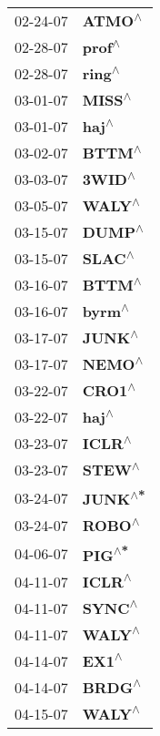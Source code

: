 \begin{supertabular}{p{0.08\textwidth}p{0.2\textwidth}}
 02-24-07 &    \textbf{ATMO\textsuperscript{$\wedge$}} \\
 02-28-07 &    \textbf{prof\textsuperscript{$\wedge$}} \\
 02-28-07 &    \textbf{ring\textsuperscript{$\wedge$}} \\
 03-01-07 &    \textbf{MISS\textsuperscript{$\wedge$}} \\
 03-01-07 &     \textbf{haj\textsuperscript{$\wedge$}} \\
 03-02-07 &    \textbf{BTTM\textsuperscript{$\wedge$}} \\
 03-03-07 &    \textbf{3WID\textsuperscript{$\wedge$}} \\
 03-05-07 &    \textbf{WALY\textsuperscript{$\wedge$}} \\
 03-15-07 &    \textbf{DUMP\textsuperscript{$\wedge$}} \\
 03-15-07 &    \textbf{SLAC\textsuperscript{$\wedge$}} \\
 03-16-07 &    \textbf{BTTM\textsuperscript{$\wedge$}} \\
 03-16-07 &    \textbf{byrm\textsuperscript{$\wedge$}} \\
 03-17-07 &    \textbf{JUNK\textsuperscript{$\wedge$}} \\
 03-17-07 &    \textbf{NEMO\textsuperscript{$\wedge$}} \\
 03-22-07 &    \textbf{CRO1\textsuperscript{$\wedge$}} \\
 03-22-07 &     \textbf{haj\textsuperscript{$\wedge$}} \\
 03-23-07 &    \textbf{ICLR\textsuperscript{$\wedge$}} \\
 03-23-07 &    \textbf{STEW\textsuperscript{$\wedge$}} \\
 03-24-07 &   \textbf{JUNK\textsuperscript{$\wedge$*}} \\
 03-24-07 &    \textbf{ROBO\textsuperscript{$\wedge$}} \\
 04-06-07 &    \textbf{PIG\textsuperscript{$\wedge$*}} \\
 04-11-07 &    \textbf{ICLR\textsuperscript{$\wedge$}} \\
 04-11-07 &    \textbf{SYNC\textsuperscript{$\wedge$}} \\
 04-11-07 &    \textbf{WALY\textsuperscript{$\wedge$}} \\
 04-14-07 &     \textbf{EX1\textsuperscript{$\wedge$}} \\
 04-14-07 &    \textbf{BRDG\textsuperscript{$\wedge$}} \\
 04-15-07 &    \textbf{WALY\textsuperscript{$\wedge$}} \\

\end{supertabular}
